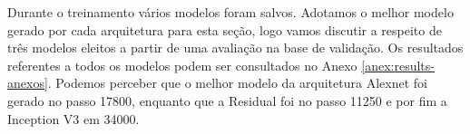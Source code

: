 Durante o treinamento vários modelos foram salvos. Adotamos o melhor modelo gerado por cada arquitetura para esta seção, logo vamos discutir a respeito de três modelos eleitos a partir de uma avaliação na base de validação. Os resultados referentes a todos os modelos podem ser consultados no Anexo \ref{anex:results-anexos}. Podemos perceber que o melhor modelo da arquitetura Alexnet foi gerado no passo 17800, enquanto que a Residual foi no passo 11250 e por fim a Inception V3 em 34000.   

